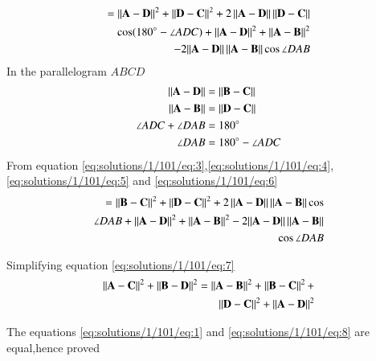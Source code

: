 \begin{align}\label{eq:solutions/1/101/eq:3}
= \left\lVert\mathbf{A-D}\right\rVert^2 +\left\lVert\mathbf{D-C}\right\rVert^2 + 2\left\lVert\mathbf{A-D}\right\rVert\left\lVert\mathbf{D-C}\right\rVert\nonumber 
\\\cos(180\degree-\angle{ADC})  +\left\lVert\mathbf{A-D}\right\rVert^2+\left\lVert\mathbf{A-B}\right\rVert^2\nonumber 
\\-2{\left\lVert\mathbf{A-D}\right\rVert\left\lVert\mathbf{A-B}\right\rVert}\cos\angle{DAB}
\end{align}
In the parallelogram $ABCD$  
\begin{align}
	\left\lVert\mathbf{A-D}\right\rVert&=\left\lVert\mathbf{B-C}\right\rVert\label{eq:solutions/1/101/eq:4}\\
	\left\lVert\mathbf{A-B}\right\rVert &= \left\lVert\mathbf{D-C}\right\rVert\label{eq:solutions/1/101/eq:5}\\
	\angle{ADC} + \angle{DAB} &= 180\degree\\
	\angle{DAB} &= 180\degree -\angle{ADC} \label{eq:solutions/1/101/eq:6}
\end{align}
From equation \eqref{eq:solutions/1/101/eq:3},\eqref{eq:solutions/1/101/eq:4},\eqref{eq:solutions/1/101/eq:5}  and \eqref{eq:solutions/1/101/eq:6}
\begin{align}
=\left\lVert\mathbf{B-C}\right\rVert^2 +\left\lVert\mathbf{D-C}\right\rVert^2+2\left\lVert\mathbf{A-D}\right\rVert\left\lVert\mathbf{A-B}\right\rVert\cos\nonumber\\\angle{DAB}+ \left\lVert\mathbf{A-D}\right\rVert^2+\left\lVert\mathbf{A-B}\right\rVert^2-2{\left\lVert\mathbf{A-D}\right\rVert\left\lVert\mathbf{A-B}\right\rVert}\nonumber\\\cos\angle{DAB}\label{eq:solutions/1/101/eq:7}  
\end{align}

Simplifying equation \eqref{eq:solutions/1/101/eq:7}
\begin{align}
   \left\lVert\mathbf{A-C}\right\rVert^2 + \left\lVert\mathbf{B-D}\right\rVert^2 = \nonumber  \left\lVert\mathbf{A-B}\right\rVert^2+\left\lVert\mathbf{B-C}\right\rVert^2+\\\left\lVert\mathbf{D-C}\right\rVert^2+\left\lVert\mathbf{A-D}\right\rVert^2\label{eq:solutions/1/101/eq:8}
\end{align}

The equations \eqref{eq:solutions/1/101/eq:1}  and \eqref{eq:solutions/1/101/eq:8} are equal,hence proved
